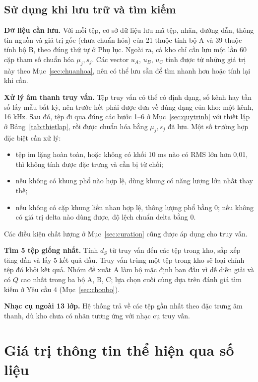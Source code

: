 \documentclass[11pt,a4paper]{article}
\begin{document}
\subsection{Sử dụng khi lưu trữ và tìm kiếm}\label{sec:sudung}
\textbf{Dữ liệu cần lưu.} Với mỗi tệp, cơ sở dữ liệu lưu mã tệp, nhãn, đường dẫn, thông tin nguồn và giá trị gốc (chưa chuẩn hóa) của 21 thuộc tính bộ A và 39 thuộc tính bộ B, theo đúng thứ tự ở Phụ lục. Ngoài ra, cả kho chỉ cần lưu một lần 60 cặp tham số chuẩn hóa $\mu_j, s_j$. Các vector $u_A$, $u_B$, $u_C$ tính được từ những giá trị này theo Mục~\ref{sec:chuanhoa}, nên có thể lưu sẵn để tìm nhanh hơn hoặc tính lại khi cần.

\textbf{Xử lý âm thanh truy vấn.} Tệp truy vấn có thể có định dạng, số kênh hay tần số lấy mẫu bất kỳ, nên trước hết phải được đưa về đúng dạng của kho: một kênh, 16 kHz. Sau đó, tệp đi qua đúng các bước 1--6 ở Mục~\ref{sec:quytrinh} với thiết lập ở Bảng~\ref{tab:thietlap}, rồi được chuẩn hóa bằng $\mu_j, s_j$ đã lưu. Một số trường hợp đặc biệt cần xử lý:
\begin{itemize}
\item tệp im lặng hoàn toàn, hoặc không có khối 10 ms nào có RMS lớn hơn 0,01, thì không tính được đặc trưng và cần bị từ chối;
\item nếu không có khung phổ nào hợp lệ, dùng khung có năng lượng lớn nhất thay thế;
\item nếu không có cặp khung liền nhau hợp lệ, thông lượng phổ bằng 0; nếu không có giá trị delta nào dùng được, độ lệch chuẩn delta bằng 0.
\end{itemize}
Các điều kiện chất lượng ở Mục~\ref{sec:curation} cũng được áp dụng cho truy vấn.

\textbf{Tìm 5 tệp giống nhất.} Tính $d_S$ từ truy vấn đến các tệp trong kho, sắp xếp tăng dần và lấy 5 kết quả đầu. Truy vấn trùng một tệp trong kho sẽ loại chính tệp đó khỏi kết quả. Nhóm đề xuất A làm bộ mặc định ban đầu vì dễ diễn giải và có $Q$ cao nhất trong ba bộ A, B, C; lựa chọn cuối cùng dựa trên đánh giá tìm kiếm ở Yêu cầu 4 (Mục~\ref{sec:chonbo}).

\textbf{Nhạc cụ ngoài 13 lớp.} Hệ thống trả về các tệp gần nhất theo đặc trưng âm thanh, dù kho chưa có nhãn tương ứng với nhạc cụ truy vấn.

\section{Giá trị thông tin thể hiện qua số liệu}\label{sec:sodo}
\end{document}
